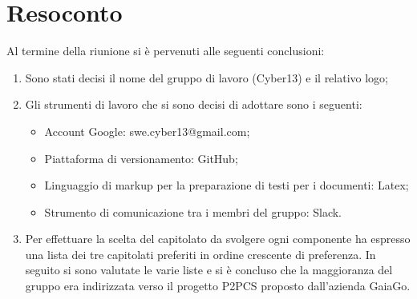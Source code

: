 \documentclass[a4paper, oneside, openany, dvipsnames, table]{article}
\begin{document}
\newpage
\section{Resoconto}
Al termine della riunione si è pervenuti alle seguenti conclusioni:	
\begin{enumerate}
	\item Sono stati decisi il nome del gruppo di lavoro (Cyber13) e il relativo logo;
	\item Gli strumenti di lavoro che si sono decisi di adottare sono i seguenti:
		\begin{itemize}
			\item Account Google: swe.cyber13@gmail.com;
			\item Piattaforma di versionamento: GitHub;
			\item Linguaggio di markup per la preparazione di testi per i documenti: Latex;
			\item Strumento di comunicazione tra i membri del gruppo: Slack.
		\end{itemize}
	\item Per effettuare la scelta del capitolato da svolgere ogni componente ha espresso una lista dei tre capitolati preferiti in ordine crescente di preferenza. In seguito si sono valutate le varie liste e si è concluso che la maggioranza del gruppo era indirizzata verso il progetto P2PCS proposto dall'azienda GaiaGo. 
\end{enumerate}
\newpage
\end{document}
